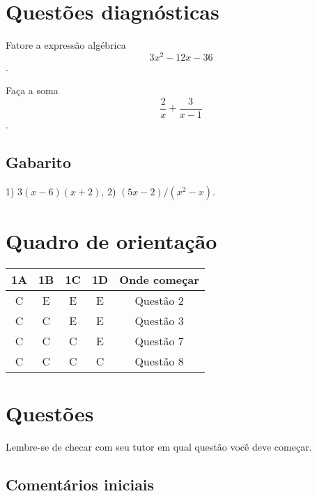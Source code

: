\documentclass[main_estudante.tex]{subfiles}
\begin{document}
\paraAmbos

\section{Questões diagnósticas}

\begin{diagnostico}
Fatore a expressão algébrica $$3x^2-12x-36$$.
\end{diagnostico}
  
\begin{diagnostico}
Faça a soma $$\frac{2}{x}+\frac{3}{x-1}$$.
\end{diagnostico}

\paraTutores
\subsection{Gabarito}

1) $3(x-6)(x+2)$, 2) $(5x-2)/(x^2-x)$.

\section{Quadro de orientação}

\begin{center}
 \begin{tabular}{|c c c c |c|} 
 \hline
 1A & 1B & 1C & 1D & Onde começar\\
 \hline
 C & E & E & E & Questão 2 \\ 
 \hline
 C & C & E & E & Questão 3 \\ 
 \hline
 C & C & C & E & Questão 7 \\ 
 \hline
 C & C & C & C & Questão 8 \\ 
 \hline
\end{tabular}
\end{center}

\paraAmbos

\section{Questões}

Lembre-se de checar com seu tutor em qual questão você deve começar.

\paraTutores

\subsection{Comentários iniciais}
\end{document}
